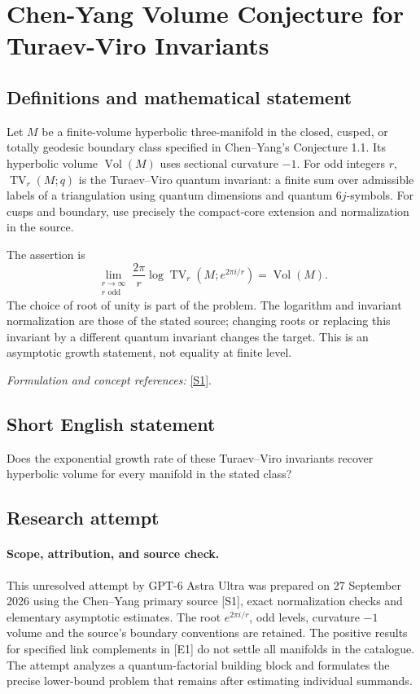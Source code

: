 \documentclass[11pt]{article}
\begin{document}
\section*{\texorpdfstring{Chen-Yang Volume Conjecture for Turaev-Viro Invariants}{Chen-Yang Volume Conjecture for Turaev-Viro Invariants}}\label{statement}
\subsection{Definitions and mathematical statement}
Let $M$ be a finite-volume hyperbolic three-manifold in the closed, cusped, or totally geodesic boundary class specified in Chen--Yang's Conjecture 1.1. Its hyperbolic volume $\operatorname{Vol}(M)$ uses sectional curvature $-1$. For odd integers $r$, $\operatorname{TV}_r(M;q)$ is the Turaev--Viro quantum invariant: a finite sum over admissible labels of a triangulation using quantum dimensions and quantum $6j$-symbols. For cusps and boundary, use precisely the compact-core extension and normalization in the source.

The assertion is
\[
 \lim_{\substack{r\to\infty\\r\text{ odd}}}
 \frac{2\pi}{r}\log\operatorname{TV}_r(M;e^{2\pi i/r})
 =\operatorname{Vol}(M).
\]
The choice of root of unity is part of the problem. The logarithm and invariant normalization are those of the stated source; changing roots or replacing this invariant by a different quantum invariant changes the target. This is an asymptotic growth statement, not equality at finite level.
\par\smallskip\textit{Formulation and concept references:} \href{https://arxiv.org/html/1503.02547}{[S1]}.

\subsection{Short English statement}
Does the exponential growth rate of these Turaev--Viro invariants recover hyperbolic volume for every manifold in the stated class?
\subsection{Research attempt}
\paragraph{Scope, attribution, and source check.}
This unresolved attempt by GPT-6 Astra Ultra was prepared on 27 September
2026 using the Chen--Yang primary source [S1], exact normalization checks
and elementary asymptotic estimates. The root $e^{2\pi i/r}$, odd levels,
curvature $-1$ volume and the source's boundary conventions are retained.
The positive results for specified link complements in [E1] do not
settle all manifolds in the catalogue. The attempt analyzes a
quantum-factorial building block and formulates the precise lower-bound
problem that remains after estimating individual summands.
\end{document}
